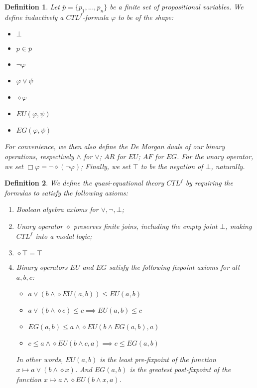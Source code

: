 \documentclass[11pt]{article}
\newtheorem{definition}{Definition}[section]
\begin{document}
\begin{definition}\label{CTLf_formulas}
    Let $\bar{p}= \{p_1,...,p_n \}$ be a finite set of propositional variables. We define inductively a \emph{$CTL^{f}$-formula} $\varphi$ to be of the shape:
    \begin{itemize}
        \setlength\itemsep{0em}
        \item[-] $\bot$
        \item[-] $p \in \bar{p}$
        \item[-] $\neg \varphi$
        \item[-] $\varphi \vee \psi$
        \item[-] $\diamond \varphi$
        \item[-] $EU(\varphi,\psi)$
        \item[-] $EG(\varphi,\psi)$ 
    \end{itemize}
    For convenience, we then also define the De Morgan duals of our binary operations, respectively $\wedge$ for $\vee$; $AR$ for $EU$; $AF$ for $EG$. For the unary operator, we set $\Box \varphi = \neg \diamond(\neg \varphi)$; Finally, we set $\top$ to be the negation of $\bot$, naturally.
\end{definition}


\begin{definition}\label{quasi_eq_CTLf}
    We define the \emph{quasi-equational theory $CTL^{f}$} by requiring the formulas to satisfy the following axioms:
    \begin{enumerate}
        \setlength\itemsep{0em}
        \item Boolean algebra axioms for $\vee,\neg,\bot$;
        \item Unary operator $\diamond$ preserves finite joins, including the empty joint $\bot$, making $CTL^f$ into a modal logic;
        \item $\diamond \top = \top$
        \item Binary operators $EU$ and $EG$ satisfy the following \emph{fixpoint axioms} for all $a,b,c$:
        \begin{itemize}
            \item[-] $a \vee (b \wedge \diamond EU(a,b)) \leq EU(a,b)$
            \item[-] $a \vee (b \wedge \diamond c) \leq c \implies EU(a,b) \leq c$ 
            \item[-] $EG(a,b)\leq a\wedge \diamond EU(b\wedge EG(a,b),a)$
            \item[-] $c\leq a\wedge \diamond EU(b\wedge c,a) \implies c \leq EG(a,b)$
        \end{itemize}
        In other words, $EU(a,b)$ is the \emph{least pre-fixpoint} of the function $x \mapsto a \vee (b \wedge \diamond x)$.
        And $EG(a,b)$ is the \emph{greatest post-fixpoint} of the function $x \mapsto a\wedge \diamond EU(b\wedge x,a)$.
    \end{enumerate}
\end{definition}
\end{document}
